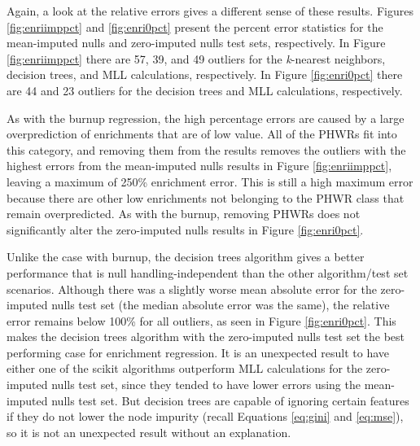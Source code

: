 Again, a look at the relative errors gives a different sense of these results.
Figures \ref{fig:enriimppct} and \ref{fig:enri0pct} present the percent error
statistics for the mean-imputed nulls and zero-imputed nulls test sets,
respectively.  In Figure \ref{fig:enriimppct} there are 57, 39, and 49 outliers
for the \textit{k}-nearest neighbors, decision trees, and \gls{MLL}
calculations, respectively.  In Figure \ref{fig:enri0pct} there are 44 and 23
outliers for the decision trees and \gls{MLL} calculations, respectively.

As with the burnup regression, the high percentage errors are caused by a large
overprediction of enrichments that are of low value. All of the \gls{PHWR}s fit
into this category, and removing them from the results removes the outliers
with the highest errors from the mean-imputed nulls results in Figure
\ref{fig:enriimppct}, leaving a maximum of 250\% enrichment error. This is
still a high maximum error because there are other low enrichments not
belonging to the \gls{PHWR} class that remain overpredicted.  As with the
burnup, removing \gls{PHWR}s does not significantly alter the zero-imputed
nulls results in Figure \ref{fig:enri0pct}.

Unlike the case with burnup, the decision trees algorithm gives a better
performance that is null handling-independent than the other algorithm/test set
scenarios. Although there was a slightly worse mean absolute error for the
zero-imputed nulls test set (the median absolute error was the same), the
relative error remains below 100\% for all outliers, as seen in Figure
\ref{fig:enri0pct}.  This makes the decision trees algorithm with the
zero-imputed nulls test set the best performing case for enrichment regression.
It is an unexpected result to have either one of the scikit algorithms
outperform \gls{MLL} calculations for the zero-imputed nulls test set, since
they tended to have lower errors using the mean-imputed nulls test set. But
decision trees are capable of ignoring certain features if they do not lower
the node impurity (recall Equations \ref{eq:gini} and \ref{eq:mse}), so it is
not an unexpected result without an explanation.

